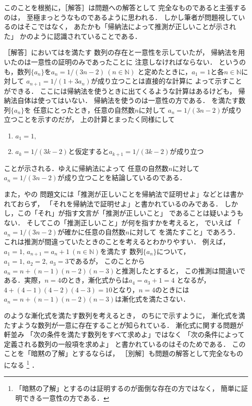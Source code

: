 \documentclass[11pt,a4paper]{ltjsarticle} %
\theoremstyle{mystyle} %
\begin{document}
このことを根拠に，［解答］は問題への解答として
完全なものであると主張するのは，
至極まっとうなものであるように思われる．
しかし筆者が問題視しているのはそこではなく，
あたかも「帰納法によって推測が正しいことが示された」
かのように認識されていることである．

［解答］においてはを満たす
数列の存在と一意性を示していたが，
帰納法を用いたのは一意性の証明のみであったことに
注意しなければならない．
というのも，数列$\{ a_n \}$を$a_n = 1/(3n-2) \ (n \in \mathbb{N})$
と定めたときに，$a_1 = 1$と各$n \in \mathbb{N}$に対して
$a_{n+1} = 1 / (1+ 3 a_n)$が成り立つことは直接的な計算に
よって示すことができる．
ここには帰納法を使うときに出てくるような計算はあるけども，
帰納法自体は使ってはいない．
帰納法を使うのは一意性の方である．
を満たす数列$\{ a_n \}$を
任意にとったとき，任意の自然数$n$に対して
$a_n = 1/(3n-2)$が成り立つことを示すのだが，
上の計算とまったく同様にして
\begin{enumerate}
  \item $a_1 = 1 ,$
  \item $a_k = 1/(3k-2)$と仮定すると$a_{k+1} = 1/(3k-2)$が成り立つ
\end{enumerate}
ことが示される．ゆえに帰納法によって
任意の自然数$n$に対して$a_n = 1/(3n-2)$が成り立つことを結論しているのである．

また，やの
問題文には「推測が正しいことを帰納法で証明せよ」などとは書かれておらず，
「それを帰納法で証明せよ」と書かれているのみである．
しかし，この「それ」が指す文言が「推測が正しいこと」
であることは疑いようもない．
そしてこの「推測正しいこと」が何を指すかを考えると，
でいえば
「$a_n = 1/(3n-2)$が確かに任意の自然数$n$に対して
を満たすこと」であろう．
これは推測が間違っていたときのことを考えるとわかりやすい．
例えば，$a_1=1, \, a_{n+1} = a_n + 1 \ (n \in \mathbb{N})$を満たす
数列$\{ a_n \}$について，$a_1=1, \, a_2 = 2, \, a_3 = 3 $であるが，
このことから$a_n = n + (n-1)(n-2)(n-3)$と推測したとすると，
この推測は間違いである．実際，$n=4$のとき，漸化式からは$a_4 = a_3 + 1 = 4$
となるが，$4 + (4-1)(4-2)(4-3) = 10$となり，$n=4$のときには
$a_n = n + (n-1)(n-2)(n-3)$は漸化式を満たさない．


のような漸化式を満たす数列を考えるとき，
のちにで示すように，
漸化式を満たすような数列が一意に存在することが知られている．
漸化式に関する問題が軒並み
「次の条件を満たす数列をすべて求めよ」ではなく
「次の条件によって定義される数列の一般項を求めよ」
と書かれているのはそのためである．
このことを「暗黙の了解」とするならば，
［別解］も問題の解答として完全なものになる
\footnote{
  「暗黙の了解」とするのは証明するのが面倒な存在の方ではなく，
  簡単に証明できる一意性の方である．
}
．
\end{document}
